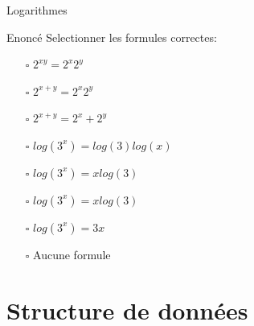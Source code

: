 \documentclass{beamer}
\begin{document}
\begin{frame}[t]{Logarithmes}
  
  \begin{block}{Enoncé}
    Selectionner les formules correctes:
  \end{block}
  \begin{block}{}
    \begin{itemize}
      \item[$\square$]  $2^{xy} = 2^x 2^y$
      \item[$\square$] $2^{x+y}  = 2^x2^y$
      \item[$\square$] $2^{x+y} = 2^x + 2^y$
      \item[$\square$] $log(3^x) = log(3)log(x)$
      \item[$\square$] $log(3^x) = xlog(3)$
      \item[$\square$] $log(3^x) = xlog(3)$
      \item[$\square$] $log(3^x) = 3x$
      \item[$\square$] Aucune formule
    \end{itemize}
  \end{block}
\end{frame}

\section{Structure de données}%
\label{sec:structure_de_donnees}
\end{document}
